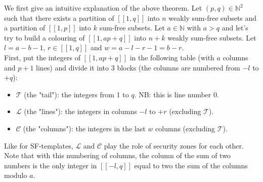 We first give an intuitive explanation of the above theorem. Let \((p, q) \in \mathbb{N}^2\) such that there exists a partition of \([\![1,q]\!]\) into \(n\) weakly sum-free
subsets and a partition of \([\![1,p]\!]\) into \(k\) sum-free subsets. Let \(a \in \mathbb{N}\) with \(a > q\) and let's try to build a colouring of \([\![1, ap + q]\!]\)
into \(n + k\) weakly sum-free subsets. Let \(l = a - b - 1\), \(r \in [\![1,q]\!]\) and \(w = a - l - r - 1 = b - r\). \\

First, put the integers of \([\![1, ap + q]\!]\) in the following table (with \(a\) columns and \(p + 1\) lines) and divide it into 3 blocks (the columns are numbered from \(-l\) to \(+q\)):

\begin{itemize}
	\item \(\mathcal{T}\) (the "tail"): the integers from 1 to \(q\). NB: this is line number 0.
	\item \(\mathcal{L}\) (the "lines"): the integers in columns \(-l\) to \(+r\) (excluding  \(\mathcal{T}\)).
	\item \(\mathcal{C}\) (the "columns"): the integers in the last \(w\) columns (excluding  \(\mathcal{T}\)).
\end{itemize}

Like for SF-templates, \(\mathcal{L}\) and \(\mathcal{C}\) play the role of security zones for each other. Note that with 
this numbering of columns, the column of the sum of two numbers is the only integer in \([\![-l,q]\!]\) equal to two the 
sum of the columns modulo \(a\).

